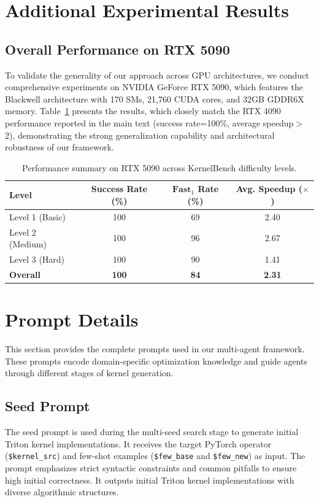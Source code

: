 \section{Additional Experimental Results}
\subsection{Overall Performance on RTX 5090}
To validate the generality of our approach across GPU architectures, we conduct comprehensive experiments on NVIDIA GeForce RTX 5090, which features the Blackwell architecture with 170 SMs, 21,760 CUDA cores, and 32GB GDDR6X memory. Table~\ref{tab:5090} presents the results, which closely match the RTX 4090 performance reported in the main text (success rate=100\%, average speedup$>$2), demonstrating the strong generalization capability and architectural robustness of our framework.

\begin{table}[h]
\centering
\caption{Performance summary on RTX 5090 across KernelBench difficulty levels.}
\label{tab:5090}
\begin{tabular}{lccc}
\toprule
\textbf{Level} & \textbf{Success Rate (\%)} & \textbf{$\mathbf{Fast}_1$ Rate (\%)} & \textbf{Avg. Speedup ($\times$)} \\
\midrule
Level 1 (Basic)      & 100   & 69 & 2.40 \\
Level 2 (Medium)     & 100   & 96 & 2.67 \\
Level 3 (Hard)       & 100   & 90 & 1.41 \\
\midrule
\textbf{Overall}     & \textbf{100} & \textbf{84} & \textbf{2.31} \\
\bottomrule
\end{tabular}
\end{table}

\section{Prompt Details}

This section provides the complete prompts used in our multi-agent framework. These prompts encode domain-specific optimization knowledge and guide agents through different stages of kernel generation.

\subsection{Seed Prompt}

The seed prompt is used during the multi-seed search stage to generate initial Triton kernel implementations. It receives the target PyTorch operator (\texttt{\$kernel\_src}) and few-shot examples (\texttt{\$few\_base} and \texttt{\$few\_new}) as input. The prompt emphasizes strict syntactic constraints and common pitfalls to ensure high initial correctness. It outputs initial Triton kernel implementations with diverse algorithmic structures.

